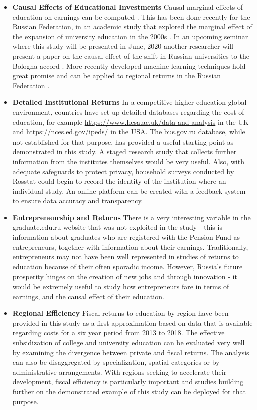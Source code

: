 \documentclass[alpha-refs]{wiley-article-04t}
\begin{document}
\begin{itemize}
	
\item \textbf{Causal Effects of Educational Investments} Causal marginal 
effects of education on earnings can be computed
\parencite{carneiro2011,heckman2018}. This has been done recently for the  
Russian Federation, in an academic study that explored the marginal effect 
of the expansion of university education in the 2000s 
\parencite{belskaya2020}. In an upcoming 
seminar where this study will be presented in June, 2020 another researcher 
will present a paper on the causal effect of the shift in Russian 
universities to the Bologna accord \parencite{avdeev2020}. More recently 
developed machine learning techniques hold great promise and can be applied 
to regional returns in the Russian Federation \parencite{kim2019}. 
	
\item \textbf{Detailed Institutional Returns} In a competitive higher 
education global environment, countries have set up detailed databases 
regarding the cost of education, for example 
\url{https://www.hesa.ac.uk/data-and-analysis} in the UK and 
\url{https://nces.ed.gov/ipeds/} in the USA. The bus.gov.ru database, while 
not established for that purpose, has provided a useful starting point as 
demonstrated in this study. A staged research study that collects further 
information from the institutes themselves would be very useful. Also, with 
adequate safeguards to protect privacy, household surveys conducted by 
Rosstat could begin to record the identity of the institution where an 
individual study. An online platform can be created with a feedback system 
to ensure data accuracy and transparency. 

\item \textbf{Entrepreneurship and Returns} There is a very interesting 
variable in the graduate.edu.ru website that was not exploited in the study 
- this is information about graduates who are registered with the Pension 
Fund as entrepreneurs, together with information about their earnings. 
Traditionally, entrepreneurs may not have been well represented in studies 
of returns to education because of their often sporadic income. However, 
Russia's future prosperity hinges on the creation of new jobs and through 
innovation - it would be extremely useful to study how entrepreneurs fare 
in terms of earnings, and the causal effect of their education.

\item \textbf{Regional Efficiency} Fiscal returns to education by region 
have been provided in this study as a first approximation based on data 
that is available regarding costs for a six year period from 2013 to 2018. 
The effective subsidization of college and university education can be 
evaluated very well by examining the divergence between private and fiscal 
returns. The analysis can also be disaggregated by specialization, spatial 
categories or by administrative arrangements. With regions seeking to 
accelerate their development, fiscal efficiency is particularly important 
and studies building further on the demonstrated example of this study can 
be deployed for that purpose. 


\end{itemize}
\end{document}
